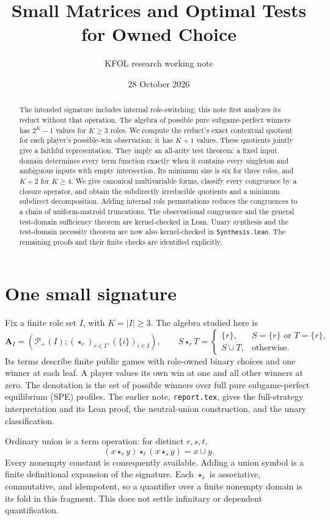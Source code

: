 \documentclass[11pt]{article}
\title{Small Matrices and Optimal Tests for Owned Choice}
\author{KFOL research working note}
\date{28 October 2026}
\newcommand{\A}{\mathbf A_I}
\newcommand{\Pow}{\mathcal P_+}
\newcommand{\ow}[1]{\mathbin{\star_{#1}}}
\begin{document}
\maketitle
\begin{abstract}
The intended signature includes internal role-switching; this note first
analyzes its reduct without that operation. The algebra of possible pure
subgame-perfect winners has $2^K-1$ values for $K\geq3$ roles. We compute
the reduct's exact contextual quotient for each
player's possible-win observation: it has $K+1$ values. These quotients
jointly give a faithful representation. They imply an all-arity test
theorem: a fixed input domain determines every term function exactly when
it contains every singleton and ambiguous inputs with empty intersection.
Its minimum size is six for three roles, and $K+2$ for $K\geq4$.
We give canonical multivariable forms, classify every congruence by a
closure operator, and obtain the subdirectly irreducible quotients and a
minimum subdirect decomposition. Adding internal role permutations
reduces the congruences to a chain of uniform-matroid truncations.
The observational congruence and the
general test-domain sufficiency theorem are kernel-checked in Lean.
Unary synthesis and the test-domain necessity theorem are now also
kernel-checked in \texttt{Synthesis.lean}.
The remaining proofs and their finite checks are identified explicitly.
\end{abstract}

\section{One small signature}

Fix a finite role set $I$, with $K=|I|\geq3$. The algebra studied here is
\[
 \A=(\Pow(I); (\star_r)_{r\in I},(\{i\})_{i\in I}),
 \qquad
 S\ow r T=\begin{cases}
 \{r\},&S=\{r\}\text{ or }T=\{r\},\\
 S\cup T,&\text{otherwise}.
 \end{cases}
\]
Its terms describe finite public games with role-owned binary choices and
one winner at each leaf. A player values its own win at one and all other
winners at zero. The denotation is the set of possible winners over full
pure subgame-perfect equilibrium (SPE) profiles. The earlier note,
\texttt{report.tex}, gives the full-strategy interpretation and its Lean
proof, the neutral-union construction, and the unary classification.

Ordinary union is a term operation: for distinct $r,s,t$,
\[
 (x\ow r y)\ow t(x\ow s y)=x\cup y.
\]
Every nonempty constant is consequently available. Adding a union symbol
is a finite definitional expansion of the signature. Each $\star_r$ is
associative, commutative, and idempotent, so a quantifier over a finite
nonempty domain is its fold in this fragment. This does not settle
infinitary or dependent quantification.
\end{document}
